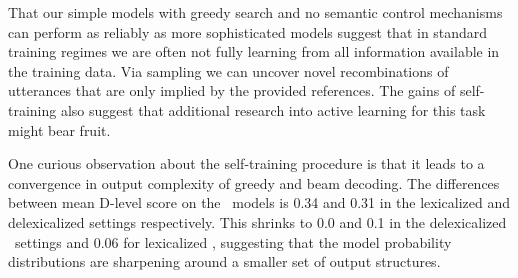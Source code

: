 





That our simple models with greedy search and no semantic control mechanisms
can perform as reliably as more sophisticated models suggest that 
in standard training regimes we 
are often not fully learning from all information available in the 
training data. Via sampling we can uncover novel recombinations of 
utterances that are only implied by the provided references.
The gains of self-training also suggest that additional
research into active learning for this task might bear fruit.

One curious observation about the self-training procedure is that 
it leads to a convergence in output complexity of greedy and beam decoding.
The differences between mean D-level score on the \basegen~models is
0.34 and 0.31 in the lexicalized and delexicalized settings respectively.
This shrinks to 0.0 and 0.1 in the delexicalized \auggen~settings and 0.06 
for lexicalized \auggen, suggesting that the model probability distributions
are sharpening around a smaller set of output structures.



